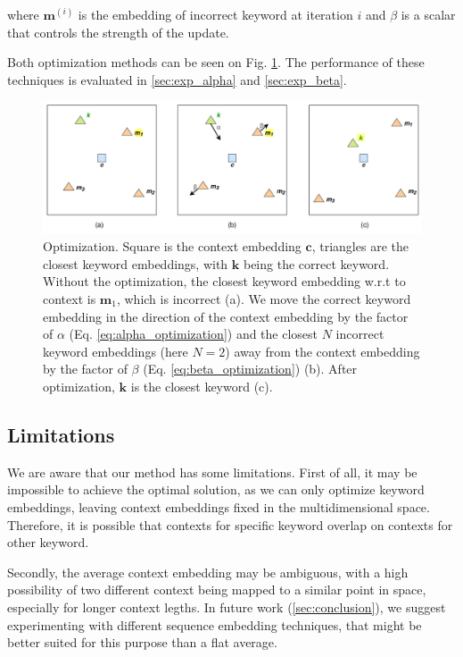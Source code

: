 \documentclass{llncs}
\begin{document}
where \(\bm{m}^{(i)}\) is the embedding of incorrect keyword at iteration \(i\) and \(\beta\) is a scalar that controls the strength of the update.

Both optimization methods can be seen on Fig. \ref{fig:opt}. The performance of these techniques is evaluated in \ref{sec:exp_alpha} and \ref{sec:exp_beta}.

\begin{figure}
    \centering
    \caption{Optimization. Square is the context embedding \(\bm{c}\), triangles are the closest keyword embeddings, with \(\bm{k}\) being the correct keyword. Without the optimization, the closest keyword embedding w.r.t to context is \(\bm{m}_{1}\), which is incorrect (a). We move the correct keyword embedding in the direction of the context embedding by the factor of \(\alpha\) (Eq. \ref{eq:alpha_optimization}) and the closest \(N\) incorrect keyword embeddings (here \(N=2\)) away from the context embedding by the factor of \(\beta\) (Eq. \ref{eq:beta_optimization}) (b). After optimization, \(\bm{k}\) is the closest keyword (c).}
    \label{fig:opt}
    \includegraphics[scale=0.31]{res/opt.png}
\end{figure}


\subsection{Limitations}
\label{sec:limitations}
We are aware that our method has some limitations.
First of all, it may be impossible to achieve the optimal solution, as we can only optimize keyword embeddings, leaving context embeddings fixed in the multidimensional space.
Therefore, it is possible that contexts for specific keyword overlap on contexts for other keyword.

Secondly, the average context embedding may be ambiguous, with a high possibility of two different context being mapped to a similar point in space, especially for longer context legths.
In future work (\ref{sec:conclusion}), we suggest experimenting with different sequence embedding techniques, that might be better suited for this purpose than a flat average.
\end{document}
